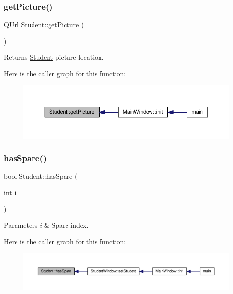 \subsubsection{\texorpdfstring{get\+Picture()}{getPicture()}}
{\footnotesize\ttfamily Q\+Url Student\+::get\+Picture (\begin{DoxyParamCaption}{ }\end{DoxyParamCaption})}

\begin{DoxyReturn}{Returns}
\hyperlink{class_student}{Student} picture location. 
\end{DoxyReturn}
Here is the caller graph for this function\+:
\nopagebreak
\begin{figure}[H]
\begin{center}
\leavevmode
\includegraphics[width=350pt]{class_student_a897fcf6f93b238dec7272f36397ab2d1_icgraph}
\end{center}
\end{figure}
\mbox{\label{class_student_a2c923389f39d4564829f5cf422cfef96}} 
\subsubsection{\texorpdfstring{has\+Spare()}{hasSpare()}}
{\footnotesize\ttfamily bool Student\+::has\+Spare (\begin{DoxyParamCaption}\item[{int}]{i }\end{DoxyParamCaption})}


\begin{DoxyParams}{Parameters}
{\em i} & Spare index. \\
\hline
\end{DoxyParams}
Here is the caller graph for this function\+:
\nopagebreak
\begin{figure}[H]
\begin{center}
\leavevmode
\includegraphics[width=350pt]{class_student_a2c923389f39d4564829f5cf422cfef96_icgraph}
\end{center}
\end{figure}
\mbox{\label{class_student_a59651e4e76bc19afca6e31cd91ba7aa0}} 

